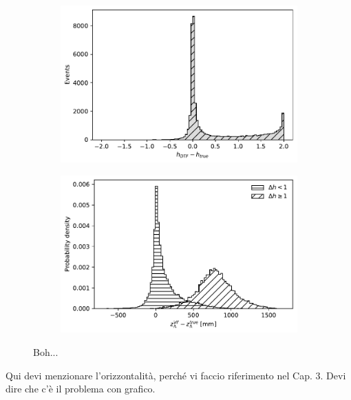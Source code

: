 \begin{figure}[t]
	\centering
	\begin{subfigure}{.45\textwidth}
		\includegraphics[width=\textwidth]{graphics/04-event_selection/Lambda_horizontality_bias.pdf}
		\caption{}
	\end{subfigure}
	\begin{subfigure}{.45\textwidth}
		\includegraphics[width=\textwidth]{graphics/04-event_selection/lambda_endvertex_z_bias_vs_horizontality_bias.pdf}
		\caption{}
	\end{subfigure}
	\caption[A and b.]{Boh...}
\end{figure}

Qui devi menzionare l'orizzontalità, perché vi faccio riferimento nel Cap. 3. Devi dire che c'è il problema con grafico.

